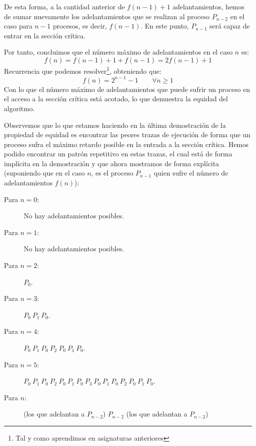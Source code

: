 \begin{description}
\begin{itemize}
                De esta forma, a la cantidad anterior de $f(n-1)+1$ adelantamientos, hemos de sumar nuevamente los adelantamientos que se realizan al proceso $P_{n-2}$ en el caso para $n-1$ procesos, es decir, $f(n-1)$. En este punto, $P_{n-1}$ será capaz de entrar en la sección crítica.
        \end{itemize}
        Por tanto, concluimos que el número máximo de adelantamientos en el caso $n$ es:
        \begin{equation*}
            f(n) = f(n-1) + 1 + f(n-1) = 2f(n-1) + 1
        \end{equation*}
        Recurrencia que podemos resolver\footnote{Tal y como aprendimos en asignaturas anteriores}, obteniendo que:
        \begin{equation*}
            f(n) = 2^{n-1} -1 \qquad \forall n\geq 1
        \end{equation*}
        Con lo que el número máximo de adelantamientos que puede sufrir un proceso en el acceso a la sección crítica está acotado, lo que demuestra la equidad del algoritmo.
\end{description}

\begin{ejemplo}
    Observemos que lo que estamos haciendo en la última demostración de la propiedad de equidad es encontrar las peores trazas de ejecución de forma que un proceso sufra el máximo retardo posible en la entrada a la sección crítica. Hemos podido encontrar un patrón repetitivo en estas trazas, el cual está de forma implícita en la demostración y que ahora mostramos de forma explícita (suponiendo que en el caso $n$, es el proceso $P_{n-1}$ quien sufre el número de adelantamientos $f(n)$):
    \begin{description}
        \item [Para $n=0$:] No hay adelantamientos posibles.
        \item [Para $n=1$:] No hay adelantamientos posibles.
        \item [Para $n=2$:] $P_0$.
        \item [Para $n=3$:] $P_0\ P_1\ P_0$.
        \item [Para $n=4$:] $P_0\ P_1\ P_0\ P_2\ P_0\ P_1\ P_0$.
        \item [Para $n=5$:] $P_0\ P_1\ P_0\ P_2\ P_0\ P_1\ P_0\ P_3\ P_0\ P_1\ P_0\ P_2\ P_0\ P_1\ P_0$.
        \item [Para $n$:] (los que adelantan a $P_{n-2}$) $P_{n-2}$ (los que adelantan a $P_{n-2}$)
    \end{description}
\end{ejemplo}


